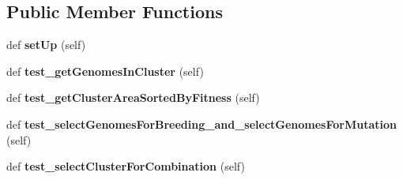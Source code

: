 \subsection*{Public Member Functions}
\begin{DoxyCompactItemize}
\item 
def {\bfseries set\+Up} (self)\hypertarget{class_n_e_a_t___py_genetics_1_1_n_e_a_t_1_1_tests_1_1_analyst_tests_1_1test__genome_selector_1_1test__genome_selector_a73634e74c61c8367095ed89b1a9ffa8d}{}\label{class_n_e_a_t___py_genetics_1_1_n_e_a_t_1_1_tests_1_1_analyst_tests_1_1test__genome_selector_1_1test__genome_selector_a73634e74c61c8367095ed89b1a9ffa8d}

\item 
def {\bfseries test\+\_\+get\+Genomes\+In\+Cluster} (self)\hypertarget{class_n_e_a_t___py_genetics_1_1_n_e_a_t_1_1_tests_1_1_analyst_tests_1_1test__genome_selector_1_1test__genome_selector_abf45d8dbc127efe9b7a89415b2f0b605}{}\label{class_n_e_a_t___py_genetics_1_1_n_e_a_t_1_1_tests_1_1_analyst_tests_1_1test__genome_selector_1_1test__genome_selector_abf45d8dbc127efe9b7a89415b2f0b605}

\item 
def {\bfseries test\+\_\+get\+Cluster\+Area\+Sorted\+By\+Fitness} (self)\hypertarget{class_n_e_a_t___py_genetics_1_1_n_e_a_t_1_1_tests_1_1_analyst_tests_1_1test__genome_selector_1_1test__genome_selector_a845cb361d31d78f62c573610a01c9c52}{}\label{class_n_e_a_t___py_genetics_1_1_n_e_a_t_1_1_tests_1_1_analyst_tests_1_1test__genome_selector_1_1test__genome_selector_a845cb361d31d78f62c573610a01c9c52}

\item 
def {\bfseries test\+\_\+select\+Genomes\+For\+Breeding\+\_\+and\+\_\+select\+Genomes\+For\+Mutation} (self)\hypertarget{class_n_e_a_t___py_genetics_1_1_n_e_a_t_1_1_tests_1_1_analyst_tests_1_1test__genome_selector_1_1test__genome_selector_abe868724b36a1423c915ca001bdfacb7}{}\label{class_n_e_a_t___py_genetics_1_1_n_e_a_t_1_1_tests_1_1_analyst_tests_1_1test__genome_selector_1_1test__genome_selector_abe868724b36a1423c915ca001bdfacb7}

\item 
def {\bfseries test\+\_\+select\+Cluster\+For\+Combination} (self)\hypertarget{class_n_e_a_t___py_genetics_1_1_n_e_a_t_1_1_tests_1_1_analyst_tests_1_1test__genome_selector_1_1test__genome_selector_a02f6228ac878117e968633e7d0652e37}{}\label{class_n_e_a_t___py_genetics_1_1_n_e_a_t_1_1_tests_1_1_analyst_tests_1_1test__genome_selector_1_1test__genome_selector_a02f6228ac878117e968633e7d0652e37}


\end{DoxyCompactItemize}
